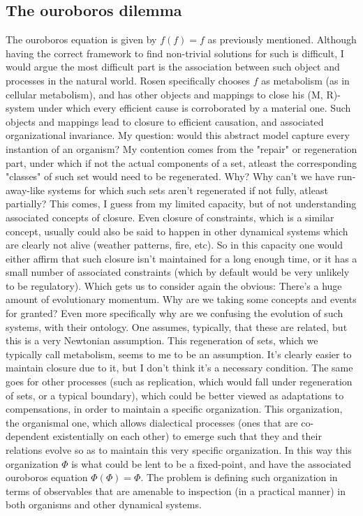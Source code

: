 \documentclass[a4paper,12pt,twoside,leqno]{article}
\begin{document}
\subsection*{The ouroboros dilemma}
The ouroboros equation is given by $f(f) = f$ as previously mentioned. Although having the correct framework to find non-trivial solutions for such is difficult, I would argue the most difficult part is the association between such object and processes in the natural world. Rosen specifically chooses $f$ as metabolism (as in cellular metabolism), and has other objects and mappings to close his (M, R)-system under which every efficient cause is corroborated by a material one. Such objects and mappings lead to closure to efficient causation, and associated organizational invariance. My question: would this abstract model capture every instantion of an organism? My contention comes from the "repair" or regeneration part, under which if not the actual components of a set, atleast the corresponding "classes" of such set would need to be regenerated. Why? Why can't we have run-away-like systems for which such sets aren't regenerated if not fully, atleast partially? This comes, I guess from my limited capacity, but of not understanding associated concepts of closure. Even closure of constraints, which is a similar concept, usually could also be said to happen in other dynamical systems which are clearly not alive (weather patterns, fire, etc). So in this capacity one would either affirm that such closure isn't maintained for a long enough time, or it has a small number of associated constraints (which by default would be very unlikely to be regulatory). Which gets us to consider again the obvious: There's a huge amount of evolutionary momentum. Why are we taking some concepts and events for granted? Even more specifically why are we confusing the evolution of such systems, with their ontology. One assumes, typically, that these are related, but this is a very Newtonian assumption. This regeneration of sets, which we typically call metabolism, seems to me to be an assumption. It's clearly easier to maintain closure due to it, but I don't think it's a necessary condition. The same goes for other processes (such as replication, which would fall under regeneration of sets, or a typical boundary), which could be better viewed as adaptations to compensations, in order to maintain a specific organization. This organization, the organismal one, which allows dialectical processes (ones that are co-dependent existentially on each other) to emerge such that they and their relations evolve so as to maintain this very specific organization. In this way this organization $\Phi$ is what could be lent to be a fixed-point, and have the associated ouroboros equation $\Phi (\Phi) = \Phi$. The problem is defining such organization in terms of observables that are amenable to inspection (in a practical manner) in both organisms and other dynamical systems.
\end{document}
